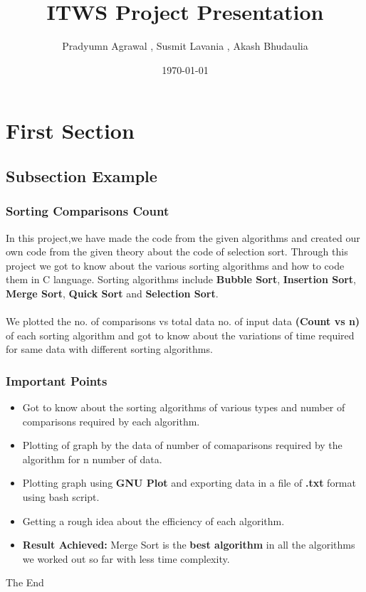 \documentclass{beamer}
\title[Project]{ITWS Project Presentation} %
\author{Pradyumn Agrawal , Susmit Lavania , Akash Bhudaulia} %
\institute %
{
The LNM Institute of Information Technology , Jaipur\\
\medskip
\textit{15UCS096 , 15UCS148 , 15UEC009}
}
\date{\today} %
\begin{document}
\begin{frame}
\titlepage %
\end{frame}

\section{First Section}
\subsection{Subsection Example}

\begin{frame}
\frametitle{Sorting Comparisons Count}
In this project,we have made the code from the given algorithms and created our own code from the given theory about the code of selection sort. Through this project we got to know about the various sorting algorithms and how to code them in C language. Sorting algorithms include \textbf{Bubble Sort}, \textbf{Insertion Sort}, \textbf{Merge Sort}, \textbf{Quick Sort} and \textbf{Selection Sort}.\\~\\

We plotted the no. of comparisons vs total data no. of input data \textbf{(Count vs n)} of each sorting algorithm and got to know about the variations of time required for same data with different sorting algorithms.
\end{frame}



\begin{frame}
\frametitle{Important Points}
\begin{itemize}
\item Got to know about the sorting algorithms of various types and number of comparisons required by each algorithm.
\item Plotting of graph by the data of number of comaparisons required by the algorithm for n number of data.
\item Plotting graph using \textbf{GNU Plot} and exporting data in a file of \textbf{.txt} format using bash script.
\item Getting a rough idea about the efficiency of each algorithm.
\item \textbf{Result Achieved:} Merge Sort is the \textbf{best algorithm} in all the algorithms we worked out so far with less time complexity.
\end{itemize}
\end{frame}

\begin{frame}
\Huge{\centerline{The End}}
\end{frame}

\end{document}
